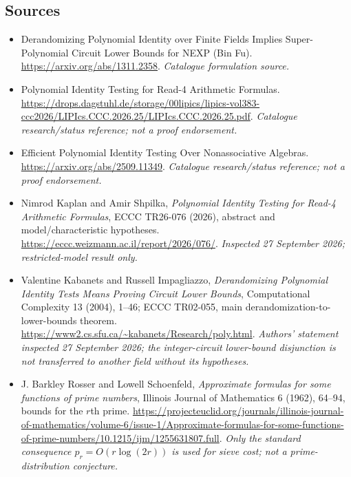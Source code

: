 \documentclass[11pt,a4paper]{article}
\numberwithin{equation}{section}
\begin{document}
\subsection{Sources}
\begin{itemize}\raggedright
\item[\textnormal{[S1]}]\hypertarget{source:30006708:1}{} Derandomizing Polynomial Identity over Finite Fields Implies Super-Polynomial Circuit Lower Bounds for NEXP (Bin Fu).
\url{https://arxiv.org/abs/1311.2358}.
{\small\textit{Catalogue formulation source.}}
\item[\textnormal{[S2]}]\hypertarget{source:30006708:2}{} Polynomial Identity Testing for Read-4 Arithmetic Formulas.
\url{https://drops.dagstuhl.de/storage/00lipics/lipics-vol383-ccc2026/LIPIcs.CCC.2026.25/LIPIcs.CCC.2026.25.pdf}.
{\small\textit{Catalogue research/status reference; not a proof endorsement.}}
\item[\textnormal{[S3]}]\hypertarget{source:30006708:3}{} Efficient Polynomial Identity Testing Over Nonassociative Algebras.
\url{https://arxiv.org/abs/2509.11349}.
{\small\textit{Catalogue research/status reference; not a proof endorsement.}}
\item[\textnormal{[E1]}]\hypertarget{extra:30006708:1}{} Nimrod Kaplan and Amir Shpilka,
\emph{Polynomial Identity Testing for Read-4 Arithmetic Formulas},
ECCC TR26-076 (2026), abstract and model/characteristic hypotheses.
\url{https://eccc.weizmann.ac.il/report/2026/076/}.
{\small\textit{Inspected 27 September 2026; restricted-model result only.}}
\item[\textnormal{[E2]}]\hypertarget{extra:30006708:2}{} Valentine Kabanets and Russell Impagliazzo,
\emph{Derandomizing Polynomial Identity Tests Means Proving Circuit Lower Bounds},
Computational Complexity 13 (2004), 1--46; ECCC TR02-055,
main derandomization-to-lower-bounds theorem.
\url{https://www2.cs.sfu.ca/~kabanets/Research/poly.html}.
{\small\textit{Authors' statement inspected 27 September 2026; the integer-circuit
lower-bound disjunction is not transferred to another field without its hypotheses.}}
\item[\textnormal{[E3]}]\hypertarget{extra:30006708:3}{} J. Barkley Rosser and Lowell Schoenfeld,
\emph{Approximate formulas for some functions of prime numbers},
Illinois Journal of Mathematics 6 (1962), 64--94, bounds for the $r$th prime.
\url{https://projecteuclid.org/journals/illinois-journal-of-mathematics/volume-6/issue-1/Approximate-formulas-for-some-functions-of-prime-numbers/10.1215/ijm/1255631807.full}.
{\small\textit{Only the standard consequence $p_r=O(r\log(2r))$ is used for
sieve cost; not a prime-distribution conjecture.}}
\end{itemize}
\end{document}

